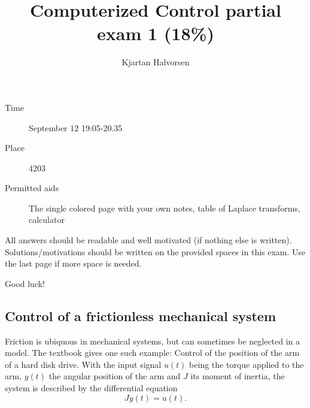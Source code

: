 \documentclass[letterpaper,12pt]{scrartcl}
\title{Computerized Control partial exam 1 (18\%)}
\author{Kjartan Halvorsen}
\date{}
\newcommand{\bmpl}{\begin{minipage}[t]{\textwidth}}
\newcommand{\emp}{\end{minipage}}
\begin{document}
\maketitle


\begin{description}
\item[Time] September 12 19:05-20.35
\item[Place] 4203
\item[Permitted aids] The single colored page with your own notes, table of Laplace transforms, calculator
\end{description}

All answers should be readable and well motivated (if nothing else is written). Solutions/motivations should be written on the provided spaces in this exam. Use the last page if more space is needed.

\begin{center}
{\Large Good luck!} \\
\end{center}

\noindent
\fbox{
\bmpl
{\bf Matricula and name:}\\
\vspace*{14mm}
\emp}




\subsection*{Control of a frictionless mechanical system}
Friction is ubiquous in mechanical systems, but can sometimes be neglected in a model. The textbook gives one such example: Control of the position of the arm of a hard disk drive. With the input signal $u(t)$ being the torque applied to the arm, $y(t)$ the angular position of the arm and $J$ its moment of inertia, the system is described by the differential equation
\begin{equation}
 J\ddot{y}(t) = u(t).
\label{eq:ode}
\end{equation}

\begin{center}
\end{center}
\end{document}
